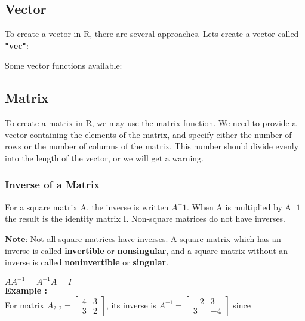 \documentclass[12pt, right open]{memoir}
\begin{document}
\subsection{Vector}
To create a vector in R, there are several approaches. 
Lets create a vector called \textbf{"vec"}:


Some vector functions available:


\subsection{Matrix}
To create a matrix in R, we may use the matrix function.  We need to provide a vector containing the elements of the matrix, and specify either the number of rows or the number of columns of the matrix.  This number should divide evenly into the length of the vector, or we will get a warning.  \\

\subsubsection{Inverse of a Matrix}
For a square matrix A, the inverse is written $A^-1$. When A is multiplied by A$^-1$ the result is the identity matrix I. Non-square matrices do not have inverses.

\textbf{Note}: Not all square matrices have inverses. A square matrix which has an inverse is called \textbf{invertible} or \textbf{nonsingular}, and a square matrix without an inverse is called \textbf{noninvertible} or \textbf{singular}.

$AA^{-1} = A^{-1}A = I$ \\
\textbf{Example :} \\
For matrix 
$
A_{2,2} = 
\begin{bmatrix}
4 & 3 \\
3 & 2 
\end{bmatrix}
$, its inverse is 
$A^{-1} =
\begin{bmatrix}
-2 & 3 \\
3 & -4 
\end{bmatrix}
$ since \\ \\
\end{document}
